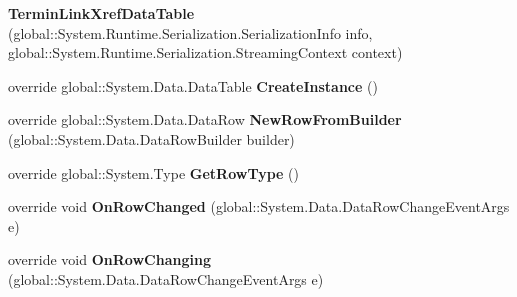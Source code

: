\begin{DoxyCompactItemize}
\item 
{\bfseries Termin\+Link\+Xref\+Data\+Table} (global\+::\+System.\+Runtime.\+Serialization.\+Serialization\+Info info, global\+::\+System.\+Runtime.\+Serialization.\+Streaming\+Context context)\hypertarget{class_products_1_1_data_1_1ds_sage_1_1_termin_link_xref_data_table_af34c8cdd1662c25ec88ae355777377dc}{}\label{class_products_1_1_data_1_1ds_sage_1_1_termin_link_xref_data_table_af34c8cdd1662c25ec88ae355777377dc}

\item 
override global\+::\+System.\+Data.\+Data\+Table {\bfseries Create\+Instance} ()\hypertarget{class_products_1_1_data_1_1ds_sage_1_1_termin_link_xref_data_table_a610777e076184e379fb9ce0b752108b4}{}\label{class_products_1_1_data_1_1ds_sage_1_1_termin_link_xref_data_table_a610777e076184e379fb9ce0b752108b4}

\item 
override global\+::\+System.\+Data.\+Data\+Row {\bfseries New\+Row\+From\+Builder} (global\+::\+System.\+Data.\+Data\+Row\+Builder builder)\hypertarget{class_products_1_1_data_1_1ds_sage_1_1_termin_link_xref_data_table_aa7313df8323ff2ba1b5d51a9bfaecbce}{}\label{class_products_1_1_data_1_1ds_sage_1_1_termin_link_xref_data_table_aa7313df8323ff2ba1b5d51a9bfaecbce}

\item 
override global\+::\+System.\+Type {\bfseries Get\+Row\+Type} ()\hypertarget{class_products_1_1_data_1_1ds_sage_1_1_termin_link_xref_data_table_ad67343786e139968559c067c9bd922cd}{}\label{class_products_1_1_data_1_1ds_sage_1_1_termin_link_xref_data_table_ad67343786e139968559c067c9bd922cd}

\item 
override void {\bfseries On\+Row\+Changed} (global\+::\+System.\+Data.\+Data\+Row\+Change\+Event\+Args e)\hypertarget{class_products_1_1_data_1_1ds_sage_1_1_termin_link_xref_data_table_a563efa159ff90e076836e74dc0ea5953}{}\label{class_products_1_1_data_1_1ds_sage_1_1_termin_link_xref_data_table_a563efa159ff90e076836e74dc0ea5953}

\item 
override void {\bfseries On\+Row\+Changing} (global\+::\+System.\+Data.\+Data\+Row\+Change\+Event\+Args e)\hypertarget{class_products_1_1_data_1_1ds_sage_1_1_termin_link_xref_data_table_af8d11f9bb3e96445950c9ce722c1b0e9}{}\label{class_products_1_1_data_1_1ds_sage_1_1_termin_link_xref_data_table_af8d11f9bb3e96445950c9ce722c1b0e9}


\end{DoxyCompactItemize}
